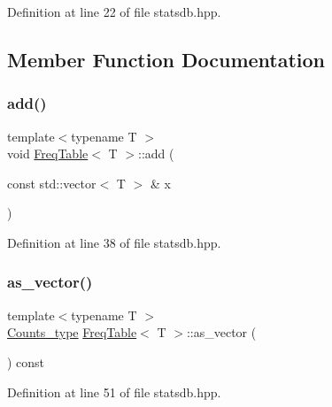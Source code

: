 Definition at line 22 of file statsdb.\+hpp.



\subsection{Member Function Documentation}
\mbox{\label{class_freq_table_a919e08556ba3aa9535a64827315bb89a}} 
\subsubsection{\texorpdfstring{add()}{add()}}
{\footnotesize\ttfamily template$<$typename T $>$ \\
void \hyperlink{class_freq_table}{Freq\+Table}$<$ T $>$\+::add (\begin{DoxyParamCaption}\item[{const std\+::vector$<$ T $>$ \&}]{x }\end{DoxyParamCaption})\hspace{0.3cm}{\ttfamily [inline]}}



Definition at line 38 of file statsdb.\+hpp.

\mbox{\label{class_freq_table_a1898e62605d8753e170189936d403e05}} 
\subsubsection{\texorpdfstring{as\+\_\+vector()}{as\_vector()}}
{\footnotesize\ttfamily template$<$typename T $>$ \\
\hyperlink{typedefs_8hpp_aee40fa17c1fddb63dd1f2b1470ade95b}{Counts\+\_\+type} \hyperlink{class_freq_table}{Freq\+Table}$<$ T $>$\+::as\+\_\+vector (\begin{DoxyParamCaption}{ }\end{DoxyParamCaption}) const\hspace{0.3cm}{\ttfamily [inline]}}



Definition at line 51 of file statsdb.\+hpp.

\mbox{\label{class_freq_table_a326660096e4309780aea8355d0f74ac7}} 

